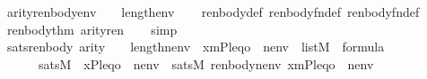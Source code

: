 \begin{isabellebody}
\ \ arity{\isacharparenleft}{\kern0pt}renbody{\isacharparenleft}{\kern0pt}{\isasymphi}{\isacharcomma}{\kern0pt}env{\isacharparenright}{\kern0pt}{\isacharparenright}{\kern0pt}\ {\isasymle}\ {}\ {\isacharhash}{\kern0pt}{\isacharplus}{\kern0pt}\ length{\isacharparenleft}{\kern0pt}env{\isacharparenright}{\kern0pt}{\isachardoublequoteclose}\isanewline
%
\isadelimproof
\ \ %
\endisadelimproof
%
\isatagproof
{}\isamarkupfalse%
\ renbody{\isacharunderscore}{\kern0pt}def\ renbody{\isacharunderscore}{\kern0pt}fn{\isacharunderscore}{\kern0pt}def\ renbody{}{\isacharunderscore}{\kern0pt}fn{\isacharunderscore}{\kern0pt}def\isanewline
\ \ \isamarkupfalse%
\ \ renbody{}{\isacharunderscore}{\kern0pt}thm{\isacharparenleft}{\kern0pt}{}{\isacharparenright}{\kern0pt}\ arity{\isacharunderscore}{\kern0pt}ren\isanewline
\ \ \isamarkupfalse%
\ simp%
\endisatagproof
{\isafoldproof}%
%
\isadelimproof
\isanewline
%
\endisadelimproof
\isanewline
{}\isamarkupfalse%
\isanewline
\ \ sats{\isacharunderscore}{\kern0pt}renbody{\isacharcolon}{\kern0pt}\ {\isachardoublequoteopen}arity{\isacharparenleft}{\kern0pt}{\isasymphi}{\isacharparenright}{\kern0pt}\ {\isasymle}\ {}\ {\isacharhash}{\kern0pt}{\isacharplus}{\kern0pt}\ length{\isacharparenleft}{\kern0pt}nenv{\isacharparenright}{\kern0pt}\ {\isasymLongrightarrow}\ {\isacharbrackleft}{\kern0pt}{\isasymalpha}{\isacharcomma}{\kern0pt}x{\isacharcomma}{\kern0pt}m{\isacharcomma}{\kern0pt}P{\isacharcomma}{\kern0pt}leq{\isacharcomma}{\kern0pt}o{\isacharbrackright}{\kern0pt}\ {\isacharat}{\kern0pt}\ nenv\ {\isasymin}\ list{\isacharparenleft}{\kern0pt}M{\isacharparenright}{\kern0pt}\ {\isasymLongrightarrow}\ {\isasymphi}{\isasymin}formula\ {\isasymLongrightarrow}\isanewline
\ \ \ \ \ \ \ sats{\isacharparenleft}{\kern0pt}M{\isacharcomma}{\kern0pt}\ {\isasymphi}{\isacharcomma}{\kern0pt}\ {\isacharbrackleft}{\kern0pt}x{\isacharcomma}{\kern0pt}{\isasymalpha}{\isacharcomma}{\kern0pt}P{\isacharcomma}{\kern0pt}leq{\isacharcomma}{\kern0pt}o{\isacharbrackright}{\kern0pt}\ {\isacharat}{\kern0pt}\ nenv{\isacharparenright}{\kern0pt}\ {\isasymlongleftrightarrow}\ sats{\isacharparenleft}{\kern0pt}M{\isacharcomma}{\kern0pt}\ renbody{\isacharparenleft}{\kern0pt}{\isasymphi}{\isacharcomma}{\kern0pt}nenv{\isacharparenright}{\kern0pt}{\isacharcomma}{\kern0pt}\ {\isacharbrackleft}{\kern0pt}{\isasymalpha}{\isacharcomma}{\kern0pt}x{\isacharcomma}{\kern0pt}m{\isacharcomma}{\kern0pt}P{\isacharcomma}{\kern0pt}leq{\isacharcomma}{\kern0pt}o{\isacharbrackright}{\kern0pt}\ {\isacharat}{\kern0pt}\ nenv{\isacharparenright}{\kern0pt}{\isachardoublequoteclose}\isanewline

\end{isabellebody}
